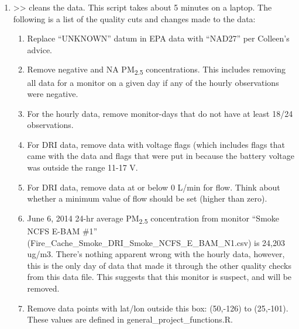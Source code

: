 \begin{enumerate}[nolistsep]
\item {} >> cleans the data. This script takes about 5 minutes on a laptop. The following is a list of the quality cuts and changes made to the data:
	\begin{enumerate}[nolistsep]
	\item Replace ``UNKNOWN'' datum in EPA data with ``NAD27'' per Colleen's advice.
	\item Remove negative and NA PM\textsubscript{2.5} concentrations. This includes removing all data for a monitor on a given day if any of the hourly observations were negative.
	\item For the hourly data, remove monitor-days that do not have at least 18/24 observations.
	\item For DRI data, remove data with voltage flags (which includes flags that came with the data and flags that were put in because the battery voltage was outside the range 11-17 V.
	\item For DRI data, remove data at or below 0 L/min for flow. Think about whether a minimum value of flow should be set (higher than zero).
	\item June 6, 2014 24-hr average PM\textsubscript{2.5} concentration from monitor ``Smoke NCFS E-BAM \#1'' (Fire\_Cache\_Smoke\_DRI\_Smoke\_NCFS\_E\_BAM\_N1.csv) is 24,203 ug/m3. There's nothing apparent wrong with the hourly data, however, this is the only day of data that made it through the other quality checks from this data file. This suggests that this monitor is suspect, and will be removed.
	\item Remove data points with lat/lon outside this box: (50,-126) to (25,-101). These values are defined in general\_project\_functions.R. %

\end{enumerate}
\end{enumerate}
